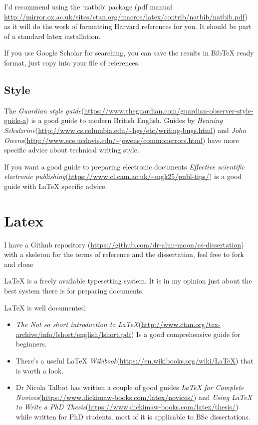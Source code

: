 \documentclass{tufte-handout}
\begin{document}
I'd recommend using the `natbib` package (pdf manual
\url{http://mirror.ox.ac.uk/sites/ctan.org/macros/latex/contrib/natbib/natbib.pdf})
as it will do the work of formatting Harvard references for you.  It should be
part of a standard latex installation.

 If you use Google Scholar for
 searching, you can save the results in BibTeX ready format, just copy into
 your file of references.

\subsection{Style}
The \emph{Guardian style guide}(\url{https://www.theguardian.com/guardian-observer-style-guide-a})  
is a good guide to modern British English.  Guides by  
\emph{Henning Schulzrine}(\url{http://www.cs.columbia.edu/~hgs/etc/writing-bugs.html})
 and
\emph{John Owens}(\url{http://www.ece.ucdavis.edu/~jowens/commonerrors.html})
 have more specific advice about technical writing style.

If you want a good guide to preparing  electronic documents \emph{Effective
scientific electronic
publishing}(\url{https://www.cl.cam.ac.uk/~mgk25/publ-tips/}) is a good guide
with LaTeX specific advice.

\section{Latex}

I have a Github repository (\url{https://github.com/dr-alun-moon/cs-dissertation})
 with a skeleton for the terms of reference and the
dissertation, feel free to fork and clone

LaTeX is a freely available typesetting system.  It is in my opinion just about 
 the best system there is for preparing documents.

LaTeX is well documented:
\begin{itemize}
\item \emph{The Not so short introduction to LaTeX}(\url{http://www.ctan.org/tex-archive/info/lshort/english/lshort.pdf})
  Is a good comprehensive guide for beginners.
\item There's a useful LaTeX \emph{Wikibook}(\url{https://en.wikibooks.org/wiki/LaTeX}) that is worth a look.
\item Dr Nicola Talbot has written a couple of good guides
	\emph{LaTeX for Complete Novices}(\url{https://www.dickimaw-books.com/latex/novices/})
	and 
	\emph{Using LaTeX to Write a PhD Thesis}(\url{https://www.dickimaw-books.com/latex/thesis/})
	while written for PhD students, most of it is applicable to BSc
dissertations.
\end{itemize}
\end{document}
